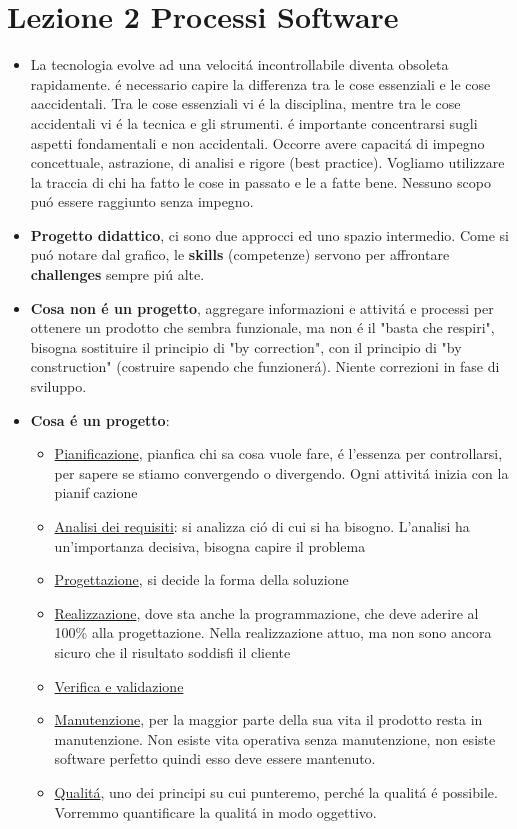 \documentclass[a4paper,10pt] {article}
\begin{document}
\section{Lezione 2 Processi Software}
\begin{itemize}
\item La tecnologia evolve ad una velocit\'a incontrollabile diventa obsoleta
rapidamente. \'e necessario capire la differenza tra le cose essenziali e le cose
aaccidentali. Tra le cose essenziali vi \'e la disciplina, mentre tra le cose
accidentali vi  \'e la tecnica e gli strumenti. \'e importante concentrarsi sugli
aspetti fondamentali e non accidentali. Occorre avere capacit\'a di impegno
concettuale, astrazione, di analisi e rigore (best practice). Vogliamo utilizzare
la traccia di chi ha fatto le cose in passato e le a fatte bene. Nessuno scopo
pu\'o essere raggiunto senza impegno.


\item \textbf{Progetto didattico}, ci sono due approcci ed uno spazio intermedio.
Come si pu\'o notare dal grafico, le \textbf{skills} (competenze) servono per
affrontare \textbf{challenges} sempre pi\'u alte.

\item \textbf{Cosa non \'e un progetto}, aggregare informazioni e attivit\'a e
processi per ottenere un prodotto che sembra funzionale, ma non \'e il "basta
che respiri", bisogna sostituire il principio di "by correction", con il principio
di "by construction" (costruire sapendo che funzioner\'a). Niente correzioni
in fase di sviluppo.

\item \textbf{Cosa \'e un progetto}:
	\begin{itemize}
	\item \underline{Pianificazione}, pianfica chi sa cosa vuole fare, \'e 
	l'essenza
	per controllarsi, per sapere se stiamo
		convergendo o divergendo. Ogni attivit\'a inizia con la pianifcazione
	\item \underline{Analisi dei requisiti}: si analizza ci\'o di cui si ha 
	bisogno.
	L'analisi ha un'importanza decisiva, bisogna
				capire il problema
				\item \underline{Progettazione}, si decide la forma della 
				soluzione
	\item \underline{Realizzazione}, dove sta anche la programmazione, che deve
	aderire al 100\% alla progettazione. Nella
	realizzazione attuo, ma non sono ancora sicuro che il risultato soddisfi il
	cliente
				\item \underline{Verifica e validazione}
	\item \underline{Manutenzione}, per la maggior parte della sua vita il 
	prodotto
	resta in manutenzione. Non esiste vita
	operativa senza manutenzione, non esiste software perfetto quindi esso deve 
	essere
	mantenuto.
	\item \underline{Qualit\'a}, uno dei principi su cui punteremo, perch\'e la 
	qualit\'a \'e
	possibile. Vorremmo quantificare la	qualit\'a in modo oggettivo.
	\end{itemize}
	

\end{itemize}
\end{document}
